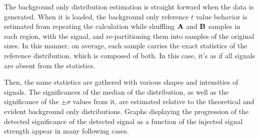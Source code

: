 \documentclass[paper/ddppaper2.tex]{subfiles}
\begin{document}
The background only distribution estimation is straight forward when the data is generated. When it is loaded, the background only reference $t$ value behavior is estimated from repeating the calculation while shuffling ${\mathbf{A}}$ and ${\mathbf{B}}$ samples in each region, with the signal, and re-partitioning them into samples of the original sizes. In this manner, on average, each sample carries the exact statistics of the reference distribution, which is composed of both. In this case, it's as if all signals are absent from the statistics.

Then, the same statistics are gathered with various shapes and intensities of signals. The significances of the median of the distribution, as well as the significance of the $\pm \sigma$ values from it, are estimated relative to the theoretical and evident background only distributions. Graphs displaying the progression of the detected significance of the detected signal as a function of the injected signal strength appear in many following cases.
\end{document}
